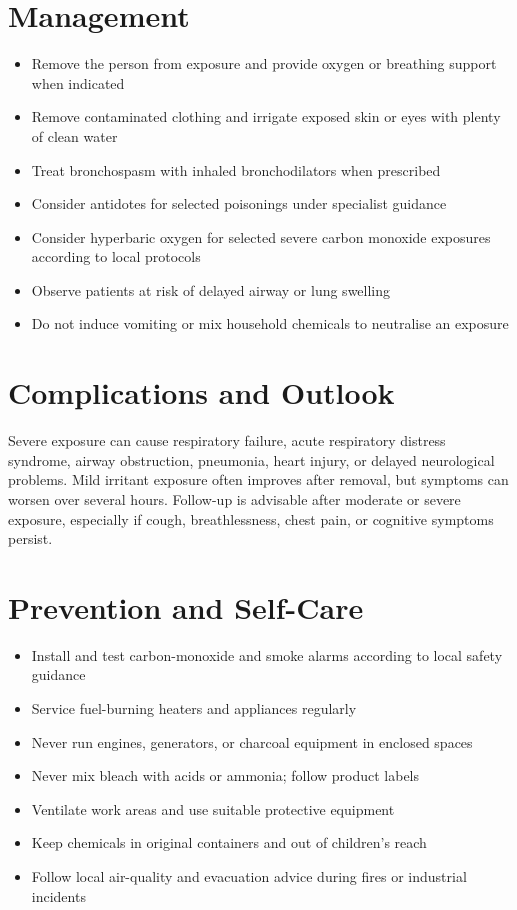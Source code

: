 \section*{Management}
\begin{itemize}
    \item Remove the person from exposure and provide oxygen or breathing support when indicated
    \item Remove contaminated clothing and irrigate exposed skin or eyes with plenty of clean water
    \item Treat bronchospasm with inhaled bronchodilators when prescribed
    \item Consider antidotes for selected poisonings under specialist guidance
    \item Consider hyperbaric oxygen for selected severe carbon monoxide exposures according to local protocols
    \item Observe patients at risk of delayed airway or lung swelling
    \item Do not induce vomiting or mix household chemicals to neutralise an exposure
\end{itemize}

\section*{Complications and Outlook}
Severe exposure can cause respiratory failure, acute respiratory distress syndrome, airway obstruction, pneumonia, heart injury, or delayed neurological problems. Mild irritant exposure often improves after removal, but symptoms can worsen over several hours. Follow-up is advisable after moderate or severe exposure, especially if cough, breathlessness, chest pain, or cognitive symptoms persist.

\section*{Prevention and Self-Care}
\begin{itemize}
    \item Install and test carbon-monoxide and smoke alarms according to local safety guidance
    \item Service fuel-burning heaters and appliances regularly
    \item Never run engines, generators, or charcoal equipment in enclosed spaces
    \item Never mix bleach with acids or ammonia; follow product labels
    \item Ventilate work areas and use suitable protective equipment
    \item Keep chemicals in original containers and out of children's reach
    \item Follow local air-quality and evacuation advice during fires or industrial incidents
\end{itemize}

